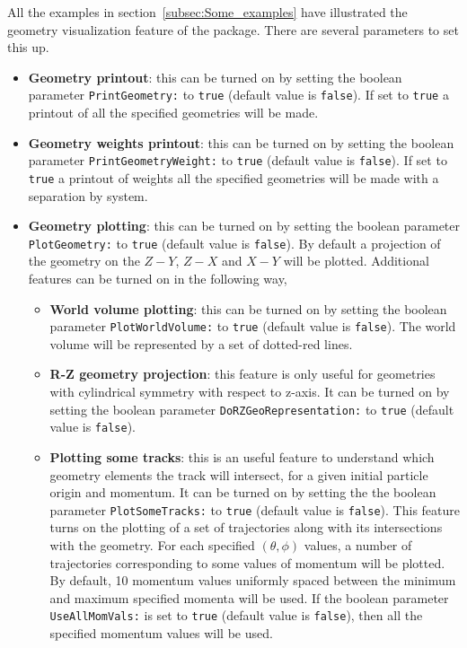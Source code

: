 All the examples in section~\ref{subsec:Some_examples} have illustrated the geometry visualization feature of the package. There are several parameters to set this up.

\begin{itemize}
  \item  {\bf Geometry printout}: this can be turned on by setting the boolean parameter {\tt PrintGeometry:} to {\tt true} (default value is {\tt false}). If set to {\tt true} a printout 
  of all the specified geometries will be made.
  
  \item  {\bf Geometry weights printout}: this can be turned on by setting the boolean parameter {\tt PrintGeometryWeight:} to {\tt true} (default value is {\tt false}). If set to {\tt true}
  a printout of weights all the specified geometries will be made with a separation by system.
  
  \item  {\bf Geometry plotting}: this can be turned on by setting the boolean parameter {\tt PlotGeometry:} to {\tt true} (default value is {\tt false}). By default a projection of the 
  geometry on the $Z-Y$, $Z-X$ and $X-Y$ will be plotted. Additional features can be turned on in the following way,
  
  \begin{itemize}
    \item  {\bf World volume plotting}: this can be turned on by setting the boolean parameter {\tt PlotWorldVolume:} to {\tt true} (default value is {\tt false}). The world volume will 
    be represented by a set of dotted-red lines.
    
    \item {\bf R-Z geometry projection}: this feature is only useful for geometries with cylindrical symmetry with respect to z-axis. It can be turned on by setting the boolean parameter 
    {\tt DoRZGeoRepresentation:} to {\tt true} (default value is {\tt false}).
    
    \item {\bf Plotting some tracks}: this is an useful feature to understand which geometry elements the track will intersect, for a given initial particle origin and momentum. It can be turned on 
    by setting the the boolean parameter {\tt PlotSomeTracks:} to {\tt true} (default value is {\tt false}). This feature turns on the plotting of a set of trajectories along with its intersections with 
    the geometry. For each specified $(\theta,\phi)$ values, a number of trajectories corresponding to some values of momentum will be plotted. By default, 10 momentum values uniformly spaced between the 
    minimum and maximum specified momenta will be used. If the boolean parameter {\tt UseAllMomVals:} is set to {\tt true} (default value is {\tt false}), then all the specified momentum values will be 
    used.
  \end{itemize}

  
\end{itemize}


